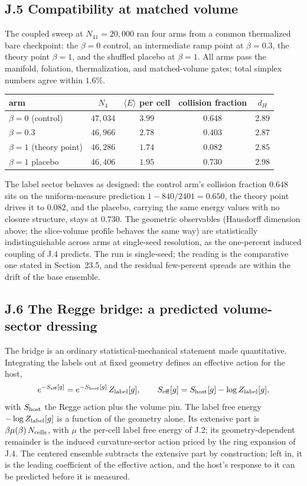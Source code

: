\documentclass[11pt]{article}
\begin{document}
\subsection*{J.5 Compatibility at matched volume}

The coupled sweep at $N_{41}=20{,}000$ ran four arms from a common thermalized bare checkpoint: the $\beta=0$ control, an intermediate ramp point at $\beta=0.3$, the theory point $\beta=1$, and the shuffled placebo at $\beta=1$. All arms pass the manifold, foliation, thermalization, and matched-volume gates; total simplex numbers agree within $1.6\%$.

\begin{center}
{\small
\begin{tabular}{lcccc}
\hline
arm & $N_4$ & $\langle E\rangle$ per cell & collision fraction & $d_H$ \\
\hline
$\beta=0$ (control) & $47{,}034$ & $3.99$ & $0.648$ & $2.89$ \\
$\beta=0.3$ & $46{,}966$ & $2.78$ & $0.403$ & $2.87$ \\
$\beta=1$ (theory point) & $46{,}286$ & $1.74$ & $0.082$ & $2.85$ \\
$\beta=1$ placebo & $46{,}406$ & $1.95$ & $0.730$ & $2.98$ \\
\hline
\end{tabular}
}
\end{center}

The label sector behaves as designed: the control arm's collision fraction $0.648$ sits on the uniform-measure prediction $1-840/2401=0.650$, the theory point drives it to $0.082$, and the placebo, carrying the same energy values with no closure structure, stays at $0.730$. The geometric observables (Hausdorff dimension above; the slice-volume profile behaves the same way) are statistically indistinguishable across arms at single-seed resolution, as the one-percent induced coupling of J.4 predicts. The run is single-seed; the reading is the comparative one stated in Section~23.5, and the residual few-percent spreads are within the drift of the base ensemble.

\subsection*{J.6 The Regge bridge: a predicted volume-sector dressing}

The bridge is an ordinary statistical-mechanical statement made quantitative. Integrating the labels out at fixed geometry defines an effective action for the host,
\[
e^{-S_{\rm eff}[g]}=e^{-S_{\rm host}[g]}\,Z_{\rm label}[g],
\qquad
S_{\rm eff}[g]=S_{\rm host}[g]-\log Z_{\rm label}[g],
\]
with $S_{\rm host}$ the Regge action plus the volume pin. The label free energy $-\log Z_{\rm label}[g]$ is a function of the geometry alone. Its extensive part is $\beta\mu(\beta)\,N_{\rm cells}$, with $\mu$ the per-cell label free energy of J.2; its geometry-dependent remainder is the induced curvature-sector action priced by the ring expansion of J.4. The centered ensemble subtracts the extensive part by construction; left in, it is the leading coefficient of the effective action, and the host's response to it can be predicted before it is measured.
\end{document}
